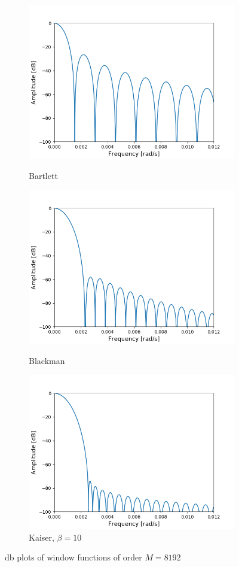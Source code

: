 \begin{figure}[H]
\begin{subfigure}{0.49\textwidth}
\centering
\includegraphics[width=\textwidth]{figures/dbplots/stft_bilag/8192/bartlett.png}
\caption{Bartlett}
\centering
\includegraphics[width=\textwidth]{figures/dbplots/stft_bilag/8192/blackman.png}
\caption{Blackman}
\centering
\includegraphics[width=\textwidth]{figures/dbplots/stft_bilag/8192/kaiser10.png}
\caption{Kaiser, $\beta=10$}
\end{subfigure}

\caption{db plots of window functions of order $M=8192$}
\label{fig:db_plots_8192}
\end{figure}



